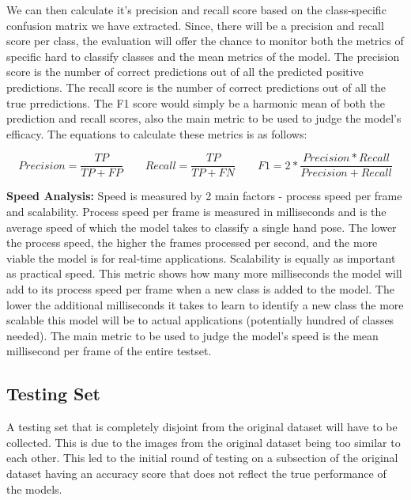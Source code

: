\documentclass[11pt]{article}
\def\paraskip{\vskip 0.4cm}
\begin{document}
        We can then calculate it's precision and recall score based on the class-specific confusion matrix we have extracted. Since, there will be a precision and recall score per class, the evaluation will offer the chance to monitor both the metrics of specific hard to classify classes and the mean metrics of the model. The precision score is the number of correct predictions out of all the predicted positive predictions. The recall score is the number of correct predictions out of all the true prredictions. The F1 score would simply be a harmonic mean of both the prediction and recall scores, also the main metric to be used to judge the model's efficacy. The equations to calculate these metrics is as follows:

        \vskip 0.3cm
        \[Precision = \frac{TP}{TP+FP} \qquad{}
        Recall = \frac{TP}{TP+FN} \qquad{}
        F1 = 2*\frac{Precision * Recall}{Precision + Recall}\]
        \vskip 0.3cm
        

        \noindent\textbf{Speed Analysis: } Speed is measured by 2 main factors - process speed per frame and scalability. Process speed per frame is measured in milliseconds and is the average speed of which the model takes to classify a single hand pose. The lower the process speed, the higher the frames processed per second, and the more viable the model is for real-time applications. Scalability is equally as important as practical speed. This metric shows how many more milliseconds the model will add to its process speed per frame when a new class is added to the model. The lower the additional milliseconds it takes to learn to identify a new class the more scalable this model will be to actual applications (potentially hundred of classes needed). The main metric to be used to judge the model's speed is the mean millisecond per frame of the entire testset.

    \subsection{Testing Set}
        A testing set that is completely disjoint from the original dataset will have to be collected. This is due to the images from the original dataset being too similar to each other. This led to the initial round of testing on a subsection of the original dataset having an accuracy score that does not reflect the true performance of the models. 

        \paraskip
\end{document}
